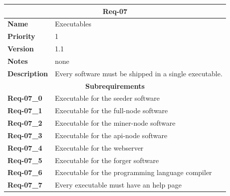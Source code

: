 \documentclass[../documentation.tex]{subfiles}
\begin{document}
\bgroup{}
\def\arraystretch{1.25}
\begin{center}
    \begin{tabular}{ |l|p{9cm}| }
        \hline
        \multicolumn{2}{|c|}{\textbf{Req-07}} \\
        \hline
        \textbf{Name} & Executables \\
        \hline
        \textbf{Priority} & 1 \\
        \hline
        \textbf{Version} & 1.1 \\
        \hline
        \textbf{Notes} & none \\
        \hline
        \textbf{Description} & Every software must be shipped in a single executable. \\
        \hline
        \multicolumn{2}{|c|}{\textbf{Subrequirements}} \\
        \hline
        \textbf{Req-07\_0} & Executable for the seeder software \\
        \hline
        \textbf{Req-07\_1} & Executable for the full-node software \\
        \hline
        \textbf{Req-07\_2} & Executable for the miner-node software \\
        \hline
        \textbf{Req-07\_3} & Executable for the api-node software \\
        \hline
        \textbf{Req-07\_4} & Executable for the webserver \\
        \hline
        \textbf{Req-07\_5} & Executable for the forger software \\
        \hline
        \textbf{Req-07\_6} & Executable for the programming language compiler \\
        \hline
        \textbf{Req-07\_7} & Every executable must have an help page \\
        \hline
    \end{tabular}
\end{center}
\egroup{}
\end{document}
